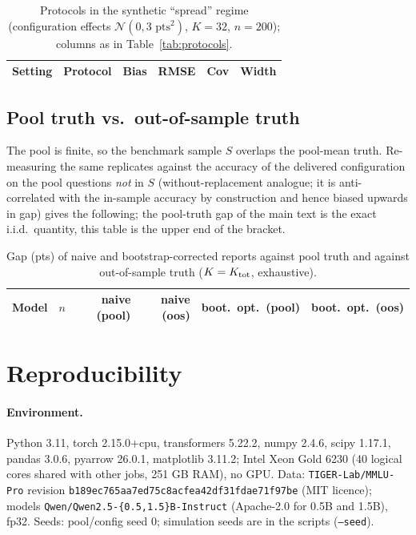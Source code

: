 \begin{table}[h]
\caption{Protocols in the synthetic ``spread'' regime (configuration effects $\mathcal N(0,3\text{ pts}^2)$, $K{=}32$, $n{=}200$); columns as in Table~\ref{tab:protocols}.}\label{tab:protocols_spread}
\centering\footnotesize
\begin{tabular}{llrrrr}
\toprule Setting & Protocol & Bias & RMSE & Cov & Width\\ \midrule
\end{tabular}
\end{table}

\subsection{Pool truth vs.\ out-of-sample truth}\label{app:oos}
The pool is finite, so the benchmark sample $S$ overlaps the pool-mean truth. Re-measuring the same replicates against the accuracy of the delivered configuration on the pool questions \emph{not} in $S$ (without-replacement analogue; it is anti-correlated with the in-sample accuracy by construction and hence biased upwards in gap) gives the following; the pool-truth gap of the main text is the exact i.i.d.\ quantity, this table is the upper end of the bracket.
\begin{table}[h]
\caption{Gap (pts) of naive and bootstrap-corrected reports against pool truth and against out-of-sample truth ($K=K_{\rm tot}$, exhaustive).}\label{tab:oos}
\centering\footnotesize
\begin{tabular}{lrrrrr}
\toprule Model & $n$ & naive (pool) & naive (oos) & boot.\ opt.\ (pool) & boot.\ opt.\ (oos)\\ \midrule
\end{tabular}
\end{table}

\section{Reproducibility}\label{app:repro}
\paragraph{Environment.} Python 3.11, torch 2.15.0+cpu, transformers 5.22.2, numpy 2.4.6, scipy 1.17.1, pandas 3.0.6, pyarrow 26.0.1, matplotlib 3.11.2; Intel Xeon Gold 6230 (40 logical cores shared with other jobs, 251 GB RAM), no GPU. Data: \texttt{TIGER-Lab/MMLU-Pro} revision \texttt{b189ec765aa7ed75c8acfea42df31fdae71f97be} (MIT licence); models \texttt{Qwen/Qwen2.5-\{0.5,1.5\}B-Instruct} (Apache-2.0 for 0.5B and 1.5B), fp32. Seeds: pool/config seed 0; simulation seeds are in the scripts (\texttt{--seed}).
